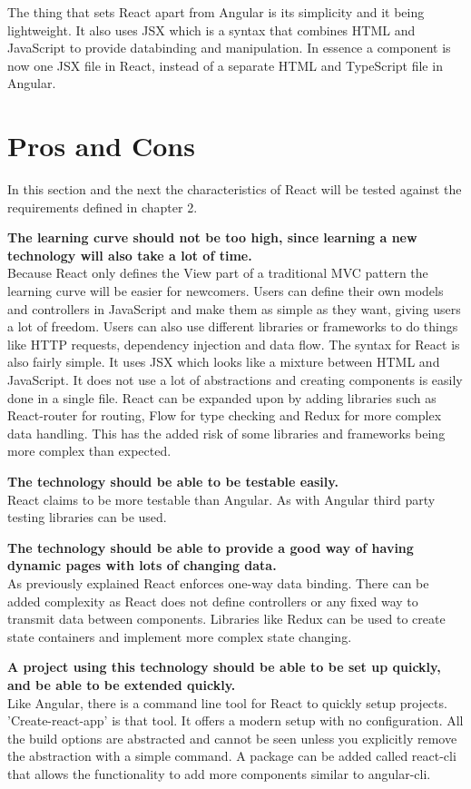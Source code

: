 \documentclass{report}
\begin{document}
	The thing that sets React apart from Angular is its simplicity and it being lightweight. It also uses JSX which is a syntax that combines HTML and JavaScript to provide databinding and manipulation. In essence a component is now one JSX file in React, instead of a separate HTML and TypeScript file in Angular.
	
	\section{Pros and Cons}
	
	In this section and the next the characteristics of React will be tested against the requirements defined in chapter 2.
	
	\textbf{The learning curve should not be too high, since learning a new technology will also take a lot of time.} \\
	Because React only defines the View part of a traditional MVC pattern the learning curve will be easier for newcomers. Users can define their own models and controllers in JavaScript and make them as simple as they want, giving users a lot of freedom. Users can also use different libraries or frameworks to do things like HTTP requests, dependency injection and data flow. 
	The syntax for React is also fairly simple. It uses JSX which looks like a mixture between HTML and JavaScript. It does not use a lot of abstractions and creating components is easily done in a single file.
	React can be expanded upon by adding libraries such as React-router for routing, Flow for type checking and Redux for more complex data handling. This has the added risk of some libraries and frameworks being more complex than expected.
	
	\textbf{The technology should be able to be testable easily.} \\
	React claims to be more testable than Angular. As with Angular third party testing libraries can be used.
	
	\textbf{The technology should be able to provide a good way of having dynamic pages with lots of changing data.} \\
	As previously explained React enforces one-way data binding. There can be added complexity as React does not define controllers or any fixed way to transmit data between components. Libraries like Redux can be used to create state containers and implement more complex state changing.
	
	\textbf{A project using this technology should be able to be set up quickly, and be able to be extended quickly.} \\
	Like Angular, there is a command line tool for React to quickly setup projects. 'Create-react-app' is that tool. It offers a modern setup with no configuration. All the build options are abstracted and cannot be seen unless you explicitly remove the abstraction with a simple command.
	A package can be added called react-cli that allows the functionality to add more components similar to angular-cli.
	
\end{document}
